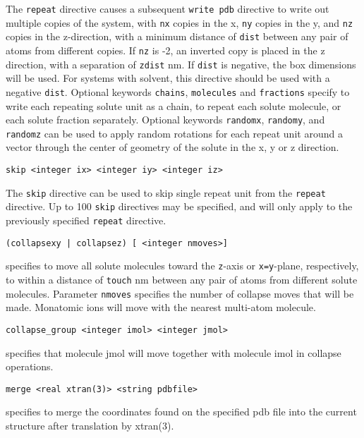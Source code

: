 The \verb+repeat+ directive causes a subsequent \verb+write pdb+
directive to write out multiple copies of the system, with \verb+nx+
copies in the x, \verb+ny+ copies in the y, and \verb+nz+ copies in 
the z-direction, with a minimum distance of \verb+dist+ between any
pair of atoms from different copies. If \verb+nz+ is -2, an inverted
copy is placed in the z direction, with a separation of \verb+zdist+ nm. 
If \verb+dist+ is negative, the box dimensions will be used. 
For systems with solvent, this directive should be used with a negative 
\verb+dist+.
Optional keywords \verb+chains+, \verb+molecules+ and \verb+fractions+
specify to write each repeating solute unit as a chain, to repeat
each solute molecule, or each solute fraction separately. Optional
keywords \verb+randomx+, \verb+randomy+, and \verb+randomz+ can be used 
to apply random rotations for each repeat unit around a vector through
the center of geometry of the solute in the x, y or z direction.

\begin{verbatim}
skip <integer ix> <integer iy> <integer iz>
\end{verbatim}

The \verb+skip+ directive can be used to skip single repeat unit
from the \verb+repeat+ directive. Up to 100 \verb+skip+ directives 
may be specified, and will only apply to the previously specified
\verb+repeat+ directive. 

\begin{verbatim}
(collapsexy | collapsez) [ <integer nmoves>]
\end{verbatim}
specifies to move all solute molecules toward the \verb+z+-axis or 
\verb+x=y+-plane, respectively, to within a distance of \verb+touch+
nm between any pair of atoms from different solute molecules. Parameter
\verb+nmoves+ specifies the number of collapse moves that will be made.
Monatomic ions will move with the nearest multi-atom molecule.

\begin{verbatim}
collapse_group <integer imol> <integer jmol>
\end{verbatim}
specifies that molecule jmol will move together with molecule imol in
collapse operations.

\begin{verbatim}
merge <real xtran(3)> <string pdbfile>
\end{verbatim}
specifies to merge the coordinates found on the specified pdb file
into the current structure after translation by xtran(3).
